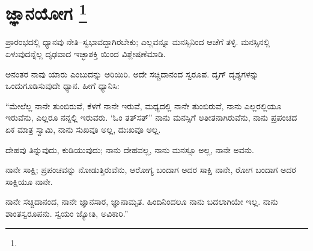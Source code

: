 
\chapter[ಜ್ಞಾನಯೋಗ ]{ಜ್ಞಾನಯೋಗ \protect\footnote{}}

ಪ್ರಾರಂಭದಲ್ಲಿ ಧ್ಯಾನವು ನೇತಿ–ಸ್ವಭಾವದ್ದಾಗಿರಬೇಕು; ಎಲ್ಲವನ್ನೂ ಮನಸ್ಸಿನಿಂದ ಆಚೆಗೆ ತಳ್ಳಿ. ಮನಸ್ಸಿನಲ್ಲಿ ಏಳುವುದನ್ನೆಲ್ಲ ದೃಢವಾದ ಇಚ್ಛಾಶಕ್ತಿ ಯಿಂದ ವಿಶ್ಲೇಷಣೆಮಾಡಿ.

ಅನಂತರ ನಾವು ಯಾರು ಎಂಬುದನ್ನು ಅರಿಯಿರಿ. ಅದೇ ಸಚ್ಚಿದಾನಂದ ಸ್ವರೂಪ. ದೃಗ್​ ದೃಶ್ಯಗಳನ್ನು ಒಂದುಗೂಡಿಸುವುದೇ ಧ್ಯಾನ. ಹೀಗೆ ಧ್ಯಾನಿಸಿ:

“ಮೇಲೆಲ್ಲ ನಾನೇ ತುಂಬಿರುವೆ, ಕೆಳಗೆ ನಾನೇ ಇರುವೆ, ಮಧ್ಯದಲ್ಲಿ ನಾನೇ ತುಂಬಿರುವೆ, ನಾನು ಎಲ್ಲರಲ್ಲಿಯೂ ಇರುವೆನು, ಎಲ್ಲರೂ ನನ್ನಲ್ಲಿ ಇರುವರು. ‘ಓಂ ತತ್​ಸತ್​” ನಾನು ಮನಸ್ಸಿಗೆ ಅತೀತನಾಗಿರುವೆನು, ನಾನು ಪ್ರಪಂಚದ ಏಕ ಮಾತ್ರ ಸ್ವಾಮಿ, ನಾನು ಸುಖವೂ ಅಲ್ಲ, ದುಃಖವೂ ಅಲ್ಲ.

ದೇಹವು ತಿನ್ನುವುದು, ಕುಡಿಯುವುದು; ನಾನು ದೇಹವಲ್ಲ, ನಾನು ಮನಸ್ಸೂ ಅಲ್ಲ, ನಾನೇ ಅವನು.

ನಾನೇ ಸಾಕ್ಷಿ; ಪ್ರಪಂಚವನ್ನು ನೋಡುತ್ತಿರುವೆನು, ಆರೋಗ್ಯ ಬಂದಾಗ ಅದರ ಸಾಕ್ಷಿ ನಾನೇ, ರೋಗ ಬಂದಾಗ ಅದರ ಸಾಕ್ಷಿಯೂ ನಾನೇ.

ನಾನೇ ಸಚ್ಚಿದಾನಂದ, ನಾನೇ ಜ್ಞಾನಸಾರ, ಜ್ಞಾನಾಮೃತ. ಹಿಂದಿನಿಂದಲೂ ನಾನು ಬದಲಾಗಿಯೇ ಇಲ್ಲ. ನಾನು ಶಾಂತಸ್ವರೂಪನು. ಸ್ವಯಂ ಜ್ಯೋತಿ, ಅವಿಕಾರಿ.”

